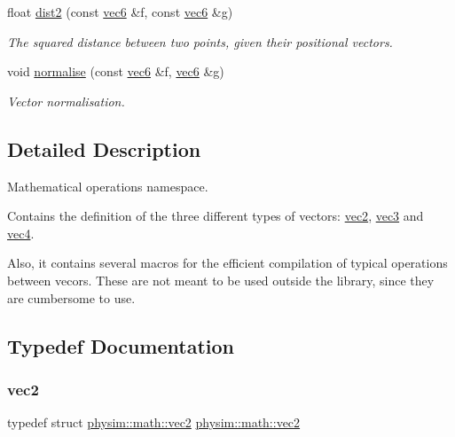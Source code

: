 \begin{DoxyCompactItemize}
\mbox{\label{namespacephysim_1_1math_a8ae04921f7fea681783094923a0d5b25}} 
float \hyperlink{namespacephysim_1_1math_a8ae04921f7fea681783094923a0d5b25}{dist2} (const \hyperlink{structphysim_1_1math_1_1vec6}{vec6} \&f, const \hyperlink{structphysim_1_1math_1_1vec6}{vec6} \&g)
\begin{DoxyCompactList}\small\item\em The squared distance between two points, given their positional vectors. \end{DoxyCompactList}\item 
void \hyperlink{namespacephysim_1_1math_a3b053d26eb6b4f23753547e609bef56e}{normalise} (const \hyperlink{structphysim_1_1math_1_1vec6}{vec6} \&f, \hyperlink{structphysim_1_1math_1_1vec6}{vec6} \&g)
\begin{DoxyCompactList}\small\item\em Vector normalisation. \end{DoxyCompactList}\end{DoxyCompactItemize}


\subsection{Detailed Description}
Mathematical operations namespace. 

Contains the definition of the three different types of vectors\+: \hyperlink{structphysim_1_1math_1_1vec2}{vec2}, \hyperlink{structphysim_1_1math_1_1vec3}{vec3} and \hyperlink{structphysim_1_1math_1_1vec4}{vec4}.

Also, it contains several macros for the efficient compilation of typical operations between vecors. These are not meant to be used outside the library, since they are cumbersome to use. 

\subsection{Typedef Documentation}
\mbox{\label{namespacephysim_1_1math_afe00b7e2c64c6f8b46f5d9be3f516acf}} 
\subsubsection{\texorpdfstring{vec2}{vec2}}
{\footnotesize\ttfamily typedef struct \hyperlink{structphysim_1_1math_1_1vec2}{physim\+::math\+::vec2}  \hyperlink{structphysim_1_1math_1_1vec2}{physim\+::math\+::vec2}}



